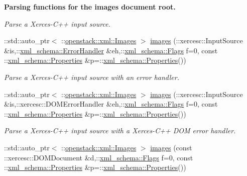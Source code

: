 \begin{Indent}{\bf Parsing functions for the images document root.}
\begin{DoxyCompactItemize}
\begin{DoxyCompactList}\small\item\em Parse a Xerces-\/C++ input source. \item\end{DoxyCompactList}\item 
::std::auto\_\-ptr$<$ ::\hyperlink{classopenstack_1_1xml_1_1Images}{openstack::xml::Images} $>$ \hyperlink{namespaceopenstack_1_1xml_a8e0ecc620142b9212f843bb8e2c87e7b}{images} (::xercesc::InputSource \&is,::\hyperlink{namespacexml__schema_ab1c9361bfd3b404eaabf0c31eded79dc}{xml\_\-schema::ErrorHandler} \&eh,::\hyperlink{namespacexml__schema_affb4c227cbd9aa7453dd1dc5a1401943}{xml\_\-schema::Flags} f=0, const ::\hyperlink{namespacexml__schema_ad27ce19a7ee1d3b1064092648898f64c}{xml\_\-schema::Properties} \&p=::\hyperlink{namespacexml__schema_ad27ce19a7ee1d3b1064092648898f64c}{xml\_\-schema::Properties}())
\begin{DoxyCompactList}\small\item\em Parse a Xerces-\/C++ input source with an error handler. \item\end{DoxyCompactList}\item 
::std::auto\_\-ptr$<$ ::\hyperlink{classopenstack_1_1xml_1_1Images}{openstack::xml::Images} $>$ \hyperlink{namespaceopenstack_1_1xml_ad2204b3c34ad60cab454d4775cf6696c}{images} (::xercesc::InputSource \&is,::xercesc::DOMErrorHandler \&eh,::\hyperlink{namespacexml__schema_affb4c227cbd9aa7453dd1dc5a1401943}{xml\_\-schema::Flags} f=0, const ::\hyperlink{namespacexml__schema_ad27ce19a7ee1d3b1064092648898f64c}{xml\_\-schema::Properties} \&p=::\hyperlink{namespacexml__schema_ad27ce19a7ee1d3b1064092648898f64c}{xml\_\-schema::Properties}())
\begin{DoxyCompactList}\small\item\em Parse a Xerces-\/C++ input source with a Xerces-\/C++ DOM error handler. \item\end{DoxyCompactList}\item 
::std::auto\_\-ptr$<$ ::\hyperlink{classopenstack_1_1xml_1_1Images}{openstack::xml::Images} $>$ \hyperlink{namespaceopenstack_1_1xml_abb30f9320014aee035fc20c1e05174c1}{images} (const ::xercesc::DOMDocument \&d,::\hyperlink{namespacexml__schema_affb4c227cbd9aa7453dd1dc5a1401943}{xml\_\-schema::Flags} f=0, const ::\hyperlink{namespacexml__schema_ad27ce19a7ee1d3b1064092648898f64c}{xml\_\-schema::Properties} \&p=::\hyperlink{namespacexml__schema_ad27ce19a7ee1d3b1064092648898f64c}{xml\_\-schema::Properties}())

\end{DoxyCompactItemize}
\end{Indent}
